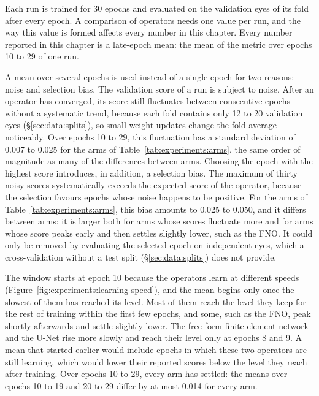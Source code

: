 Each run is trained for 30 epochs and evaluated on the validation eyes of
its fold after every epoch. A comparison of operators needs one value per
run, and the way this value is formed affects every number in this
chapter. Every number reported in this chapter is a late-epoch mean: the
mean of the metric over epochs 10 to 29 of one run.

A mean over several epochs is used instead of a single epoch for two
reasons: noise and selection
bias. The validation score of a run is subject to noise. After an operator
has converged, its score still fluctuates between consecutive epochs
without a systematic trend, because each fold contains only 12 to 20
validation eyes (\S\ref{sec:data:splits}), so small weight updates change
the fold average noticeably. Over epochs 10 to 29, this fluctuation has a
standard deviation of 0.007 to 0.025 for the arms of
Table~\ref{tab:experiments:arms}, the same order of magnitude as many of
the differences between arms. Choosing the epoch with the highest score
introduces, in addition, a selection bias. The maximum of thirty noisy
scores systematically exceeds the expected score of the operator, because
the selection favours epochs whose noise happens to be positive. For the
arms of Table~\ref{tab:experiments:arms}, this bias amounts to 0.025 to
0.050, and it differs between arms: it is larger both for arms whose
scores fluctuate more and for arms whose score peaks early and then settles
slightly lower, such as the FNO.
It could only be removed by evaluating the selected epoch on independent eyes,
which a cross-validation without a test split (\S\ref{sec:data:splits})
does not provide.

The window starts at epoch 10 because the operators learn at different
speeds
(Figure~\ref{fig:experiments:learning-speed}), and the mean begins only
once the slowest of them has reached its level. Most of them reach the
level they keep for the rest of training within the first few epochs, and
some, such as the FNO, peak shortly afterwards and settle slightly lower.
The free-form finite-element network and the U-Net rise more slowly and
reach their level only at epochs 8 and 9. A mean that started earlier
would include epochs in which these two operators are still learning,
which would lower their reported scores below the level they reach after
training. Over epochs 10 to 29, every arm has settled: the means over
epochs 10 to 19 and 20 to 29 differ by at most 0.014 for every arm.

